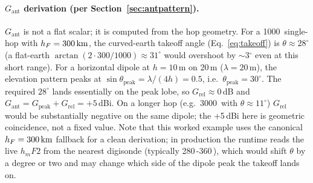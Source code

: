 \documentclass[11pt,a4paper]{article}
\newcommand{\SI}[2]{#1\,\text{#2}}
\newcommand{\km}{\text{km}}
\newcommand{\degree}{\ensuremath{{}^\circ}}
\begin{document}
\paragraph{$G_{\text{ant}}$ derivation (per Section~\ref{sec:antpattern}).}
$G_{\text{ant}}$ is not a flat scalar; it is computed from the
hop geometry. For a \SI{1000}{\km} single-hop with $h_F = \SI{300}{\km}$,
the curved-earth takeoff angle (Eq.~\ref{eq:takeoff}) is
$\theta \approx 28^\circ$ (a flat-earth
$\arctan(2 \cdot 300/1000) \approx 31^\circ$ would overshoot by
${\sim}3\degree$ even at this short range).
For a horizontal dipole at $h = 10$\,m on 20\,m
($\lambda = 20$\,m), the elevation pattern peaks at
$\sin\theta_{\text{peak}} = \lambda/(4h) = 0.5$, i.e.\
$\theta_{\text{peak}} = 30^\circ$. The required \(28^\circ\) lands
essentially on the peak lobe, so $G_{\text{rel}} \approx 0$\,dB and
$G_{\text{ant}} = G_{\text{peak}} + G_{\text{rel}} = +5$\,dBi.
On a longer hop (e.g.\ \SI{3000}{\km} with $\theta \approx 11^\circ$)
$G_{\text{rel}}$ would be substantially negative on the same dipole;
the +5\,dBi here is geometric coincidence, not a fixed value.  Note
that this worked example uses the canonical $h_F = \SI{300}{\km}$
fallback for a clean derivation; in production the runtime reads
the live $h_m\!F2$ from the nearest digisonde (typically \SI{280}--\SI{360}{km}),
which would shift $\theta$ by a degree or two and may change which
side of the dipole peak the takeoff lands on.
\end{document}
